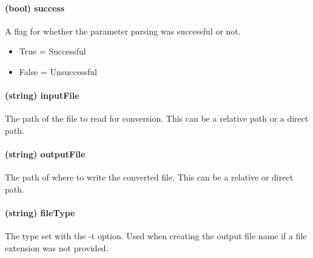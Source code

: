        \paragraph{(bool) success}
            A flag for whether the parameter parsing was successful or not.
            \begin{itemize}
                \item True = Successful
                \item False = Unsuccessful
            \end{itemize}

        \paragraph{(string) inputFile}
            The path of the file to read for conversion.  This can be a relative path or a direct path.
        
        \paragraph{(string) outputFile}
            The path of where to write the converted file.  This can be a relative or direct path.
        
        \paragraph{(string) fileType}
            The type set with the -t option.  Used when creating the output file name if a file extension was not provided.
            